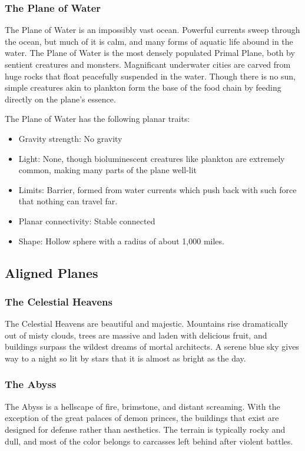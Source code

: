         \subsubsection{The Plane of Water}
        The Plane of Water is an impossibly vast ocean.
        Powerful currents sweep through the ocean, but much of it is calm, and many forms of aquatic life abound in the water.
        The Plane of Water is the most densely populated Primal Plane, both by sentient creatures and monsters.
        Magnificant underwater cities are carved from huge rocks that float peacefully suspended in the water.
        Though there is no sun, simple creatures akin to plankton form the base of the food chain by feeding directly on the plane's essence.

        The Plane of Water has the following planar traits:
        \begin{itemize}
            \item Gravity strength: No gravity
            \item Light: None, though bioluminescent creatures like plankton are extremely common, making many parts of the plane well-lit
            \item Limits: Barrier, formed from water currents which push back with such force that nothing can travel far.
            \item Planar connectivity: Stable connected
            \item Shape: Hollow sphere with a radius of about 1,000 miles.
        \end{itemize}

        \subsection{Aligned Planes}\label{Aligned Planes}

            \subsubsection{The Celestial Heavens}
                The Celestial Heavens are beautiful and majestic.
                Mountains rise dramatically out of misty clouds, trees are massive and laden with delicious fruit, and buildings surpass the wildest dreams of mortal architects.
                A serene blue sky gives way to a night so lit by stars that it is almost as bright as the day.

            \subsubsection{The Abyss}
                The Abyss is a hellscape of fire, brimstone, and distant screaming.
                With the exception of the great palaces of demon princes, the buildings that exist are designed for defense rather than aesthetics.
                The terrain is typically rocky and dull, and most of the color belongs to carcasses left behind after violent battles.

